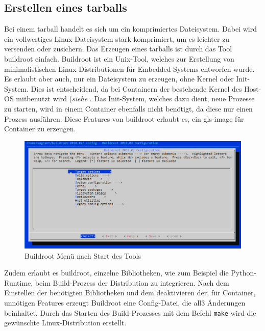 \subsection{Erstellen eines tarballs}
\label{sec:tarball}
Bei einem tarball handelt es sich um ein komprimiertes Dateisystem. Dabei wird ein vollwertiges Linux-Dateisystem stark komprimiert, um es leichter zu versenden oder zusichern. Das Erzeugen eines tarballs ist durch das Tool buildroot einfach. Buildroot ist ein Unix-Tool, welches zur Erstellung von minimalistischen Linux-Distributionen für Embedded-Systems entworfen wurde. Es erlaubt aber auch, nur ein Dateisystem zu erzeugen, ohne Kernel oder Init-System. Dies ist entscheidend, da bei Containern der bestehende Kernel des Host-OS mitbenutzt wird (\textit{siehe }. Das Init-System, welches dazu dient, neue Prozesse zu starten, wird in einem Container ebenfalls nicht benötigt, da diese nur einen Prozess ausführen. Diese Features von buildroot erlaubt es, ein \gls{gls-image} für Container zu erzeugen.

\begin{figure}[h]
	\begin{center}
		\includegraphics[scale=0.5]{bilder/buildroot-menuconfig.png}
		\caption{Buildroot Menü nach Start des Tools}
		\label{fig:buildrootMenuConfig}
	\end{center}
\end{figure}

Zudem erlaubt es buildroot, einzelne Bibliotheken, wie zum Beispiel die Python-Runtime, beim Build-Prozess der Distribution zu integrieren. Nach dem Einstellen der benötigten Bibliotheken und dem deaktivieren der, für Container, unnötigen Features erzeugt Buildroot eine Config-Datei, die all3 Änderungen beinhaltet. Durch das Starten des Build-Prozesses mit dem Befehl \texttt{make} wird die gewünschte Linux-Distribution erstellt.

